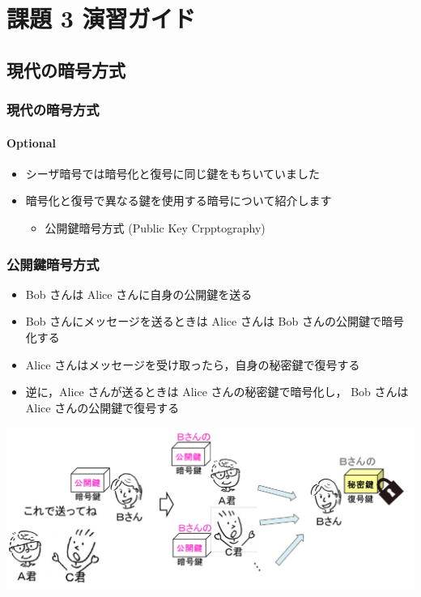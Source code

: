 \section{課題 3 演習ガイド}
%
%
\subsection{現代の暗号方式}
\begin{frame}
\frametitle{現代の暗号方式}
\framesubtitle{Optional}
  \begin{itemize}
\item シーザ暗号では暗号化と復号に同じ鍵をもちいていました
\item 暗号化と復号で異なる鍵を使用する暗号について紹介します
    \begin{itemize}
\item 公開鍵暗号方式 (Public Key Crpptography)
    \end{itemize}
  \end{itemize}
\end{frame}
\begin{frame}
\frametitle{公開鍵暗号方式}
  \begin{itemize}
\item Bob さんは Alice さんに自身の公開鍵を送る
\item Bob さんにメッセージを送るときは Alice さんは Bob さんの公開鍵で暗号化する
\item Alice さんはメッセージを受け取ったら，自身の秘密鍵で復号する
\item 逆に，Alice さんが送るときは Alice さんの秘密鍵で暗号化し， Bob さんは Alice さんの公開鍵で復号する
  \end{itemize}
  \begin{center}
\includegraphics[scale=0.5]{./Figure/elementaryCS-figPublicKey.pdf}
  \end{center}
\end{frame}
